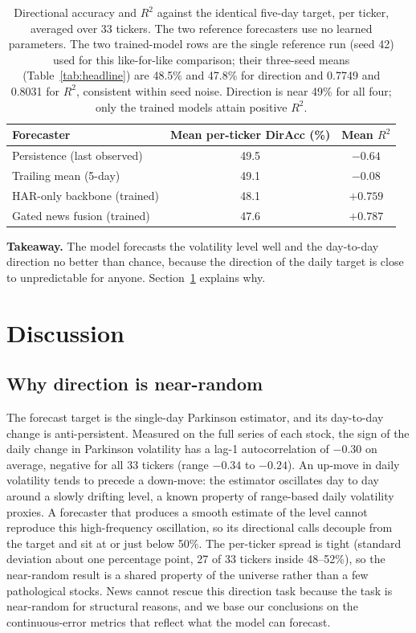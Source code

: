 \documentclass[runningheads]{llncs}
\newcommand{\rsqHAR}{0.7749}
\newcommand{\rsqNews}{0.8031}
\newcommand{\ntick}{33}
\begin{document}
\begin{table}[t]
\caption{Directional accuracy and $R^2$ against the identical five-day target, per ticker,
averaged over \ntick{} tickers. The two reference forecasters use no learned parameters. The two
trained-model rows are the single reference run (seed 42) used for this like-for-like comparison;
their three-seed means (Table~\ref{tab:headline}) are 48.5\% and 47.8\% for direction and \rsqHAR{}
and \rsqNews{} for $R^2$, consistent within seed noise. Direction is near 49\% for all four; only
the trained models attain positive $R^2$.}
\label{tab:refs}
\centering
\begin{tabular}{lcc}
\toprule
Forecaster & Mean per-ticker DirAcc (\%) & Mean $R^2$ \\
\midrule
Persistence (last observed) & 49.5 & $-0.64$ \\
Trailing mean (5-day)       & 49.1 & $-0.08$ \\
HAR-only backbone (trained) & 48.1 & $+0.759$ \\
Gated news fusion (trained) & 47.6 & $+0.787$ \\
\bottomrule
\end{tabular}
\end{table}

\smallskip
\noindent\textbf{Takeaway.} The model forecasts the volatility level well and the day-to-day
direction no better than chance, because the direction of the daily target is close to
unpredictable for anyone. Section~\ref{sec:discussion} explains why.

\section{Discussion}
\label{sec:discussion}

\subsection{Why direction is near-random}
The forecast target is the single-day Parkinson estimator, and its day-to-day change is
anti-persistent. Measured on the full series of each stock, the sign of the daily change in
Parkinson volatility has a lag-1 autocorrelation of $-0.30$ on average, negative for all \ntick{}
tickers (range $-0.34$ to $-0.24$). An up-move in daily volatility tends to precede a
down-move: the estimator oscillates day to day around a slowly drifting level, a known property of
range-based daily volatility proxies. A forecaster that produces a smooth estimate of the level
cannot reproduce this high-frequency oscillation, so its directional calls decouple from the target
and sit at or just below 50\%. The per-ticker spread is tight (standard deviation about one
percentage point, 27 of \ntick{} tickers inside 48--52\%), so the near-random result is a shared
property of the universe rather than a few pathological stocks. News cannot rescue this direction
task because the task is near-random for structural reasons, and we base our conclusions on the
continuous-error metrics that reflect what the model can forecast.
\end{document}
